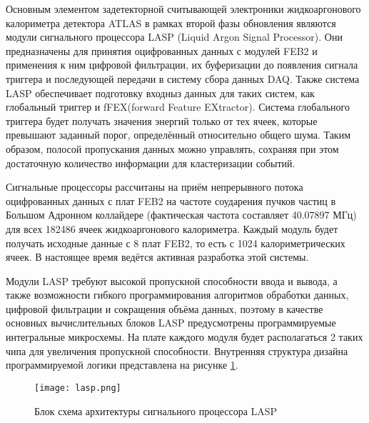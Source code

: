 Основным элементом задетекторной считывающей электроники жидкоаргонового калориметра детектора ATLAS в рамках второй фазы обновления являются модули сигнального процессора LASP (Liquid Argon Signal Processor). Они предназначены для принятия оцифрованных данных с модулей FEB2 и применения к ним цифровой фильтрации, их буферизации до появления сигнала триггера и последующей передачи в систему сбора данных DAQ. Также система LASP обеспечивает подготовку входныз данных для таких систем, как глобальный триггер и fFEX(forward Feature EXtractor). Система глобального триггера будет получать значения энергий только от тех ячеек, которые превышают заданный порог, определённый относительно общего шума. Таким образом, полосой пропускания данных можно управлять, сохраняя при этом достаточную количество информации для кластеризации событий.\par
Сигнальные процессоры рассчитаны на приём непрерывного потока оцифрованных данных с плат FEB2 на частоте соударения пучков частиц в Большом Адронном коллайдере (фактическая частота составляет 40.07897 МГц) для всех 182486 ячеек жидкоаргонового калориметра. Каждый модуль будет получать исходные данные с 8 плат FEB2, то есть с 1024 калориметрических ячеек. В настоящее время ведётся активная разработка этой системы.\par
Модули LASP требуют высокой пропускной способности ввода и вывода, а также возможности гибкого программирования алгоритмов обработки данных, цифровой фильтрации и сокращения объёма данных, поэтому в качестве основных вычислительных блоков LASP предусмотрены программируемые интегральные микросхемы. На плате каждого модуля будет располагаться 2 таких чипа для увеличения пропускной способности. Внутренняя структура дизайна программируемой логики представлена на рисунке \ref{fig:lasp}.

\begin{figure}[ht]
    \centering
    \texttt{[image: lasp.png]}
    \caption{Блок схема архитектуры сигнального процессора LASP}
    \label{fig:lasp}
\end{figure}\par

